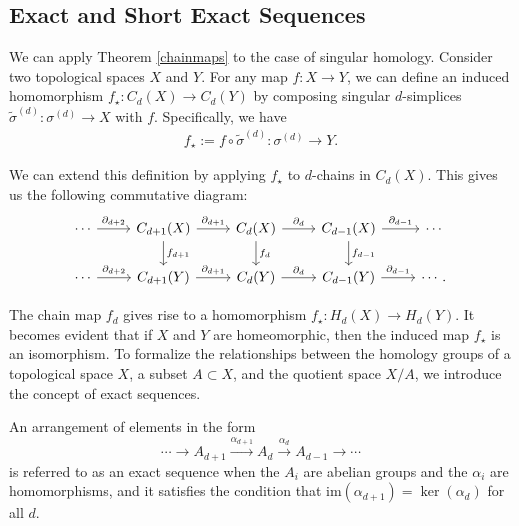 \subsection{Exact and Short Exact Sequences}
\label{ExactandShortExactSequences}
We can apply Theorem \ref{chainmaps} to the case of singular homology. Consider two topological spaces \( X \) and \( Y \). For any map \( f: X \rightarrow Y \), we can define an induced homomorphism \( f_{\star}: C_{d}(X) \rightarrow C_{d}(Y) \) by composing singular \( d \)-simplices \( \tilde{\sigma}^{(d)}: \sigma^{(d)} \rightarrow X \) with \( f \). Specifically, we have
\begin{align}
	f_{\star} := f \circ \tilde{\sigma}^{(d)}: \sigma^{(d)} \rightarrow Y. 
\end{align}

We can extend this definition by applying \( f_{\star} \) to \( d \)-chains in \( C_{d}(X) \). This gives us the following commutative diagram:
\begin{equation}
	\begin{tikzcd}
		\cdots \arrow[r, "\partial_{d+2}"] & C_{d+1}(X) \arrow[r, "\partial_{d+1}"] \arrow[d, "f_{d+1}"] & C_d(X) \arrow[r, "\partial_d"] \arrow[d, "f_{d}"] & C_{d-1}(X) \arrow[r, "\partial_{d-1}"] \arrow[d, "f_{d-1}"] & \cdots \\ 
		\cdots \arrow[r, "\partial_{d+2}"] & C_{d+1}(Y) \arrow[r, "\partial_{d+1}"] & C_d(Y) \arrow[r, "\partial_d"] & C_{d-1}(Y) \arrow[r, "\partial_{d-1}"] & \cdots.
	\end{tikzcd}
\end{equation}

The chain map \( f_{d} \) gives rise to a homomorphism \( f_{\star}: H_{d}(X) \rightarrow H_{d}(Y) \). It becomes evident that if \( X \) and \( Y \) are homeomorphic, then the induced map \( f_{\star} \) is an isomorphism. To formalize the relationships between the homology groups of a topological space \( X \), a subset \( A \subset X \), and the quotient space \( X/A \), we introduce the concept of exact sequences.

\begin{definition}
	An arrangement of elements in the form
	\begin{equation}
		\cdots \rightarrow A_{d+1}\xrightarrow{\alpha_{d+1}}A_{d}\xrightarrow{\alpha_d} A_{d-1}\xrightarrow{}\cdots
	\end{equation}
	is referred to as an exact sequence when the \( A_{i} \) are abelian groups and the \( \alpha_{i} \) are homomorphisms, and it satisfies the condition that \( \mathrm{im}(\alpha_{d+1}) = \ker(\alpha_{d})\) for all \( d \).
\end{definition}

